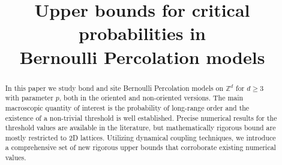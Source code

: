 \documentclass{aptpub}
\newcommand{\Z}{\mathbb{Z}}
\begin{document}

\title{Upper bounds for critical probabilities in \\ Bernoulli Percolation models} %



\begin{abstract}
In this paper we study bond and site Bernoulli Percolation models on $\Z^d$ for $d \geq 3$ with parameter $p$, both in the oriented and non-oriented versions. The main macroscopic quantity of interest is the probability of long-range order and the existence of a non-trivial threshold is well established. Precise numerical results for the threshold values are available in the literature, but mathematically rigorous bound are mostly  restricted to 2D lattices. Utilizing dynamical coupling techniques, we introduce a comprehensive set of new rigorous upper bounds that corroborate existing numerical values.
\end{abstract}


\end{document}
